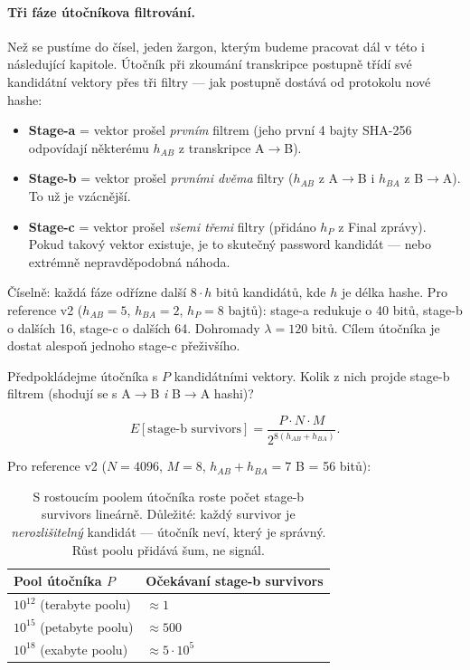 \documentclass[11pt,a4paper]{article}
\begin{document}
\paragraph{Tři fáze útočníkova filtrování.} Než se pustíme do čísel, jeden žargon, kterým budeme pracovat dál v této i následující kapitole. Útočník při zkoumání transkripce postupně třídí své kandidátní vektory přes tři filtry --- jak postupně dostává od protokolu nové hashe:
\begin{itemize}[leftmargin=*]
\item \textbf{Stage-a} = vektor prošel \emph{prvním} filtrem (jeho první 4 bajty SHA-256 odpovídají některému $h_{AB}$ z transkripce A$\to$B).
\item \textbf{Stage-b} = vektor prošel \emph{prvními dvěma} filtry ($h_{AB}$ z A$\to$B i $h_{BA}$ z B$\to$A). To už je vzácnější.
\item \textbf{Stage-c} = vektor prošel \emph{všemi třemi} filtry (přidáno $h_P$ z Final zprávy). Pokud takový vektor existuje, je to skutečný password kandidát --- nebo extrémně nepravděpodobná náhoda.
\end{itemize}
Číselně: každá fáze odřízne další $8 \cdot h$ bitů kandidátů, kde $h$ je délka hashe. Pro reference v2 ($h_{AB}=5$, $h_{BA}=2$, $h_P=8$ bajtů): stage-a redukuje o 40 bitů, stage-b o dalších 16, stage-c o dalších 64. Dohromady $\lambda = 120$ bitů. Cílem útočníka je dostat alespoň jednoho stage-c přeživšího.

\medskip
Předpokládejme útočníka s $P$ kandidátními vektory. Kolik z nich projde stage-b filtrem (shodují se s A$\to$B \emph{i} B$\to$A hashi)?

\[
E[\text{stage-b survivors}] = \frac{P \cdot N \cdot M}{2^{8(h_{AB} + h_{BA})}}.
\]

Pro reference v2 ($N = 4096$, $M = 8$, $h_{AB} + h_{BA} = 7$ B = 56 bitů):

\begin{table}[ht]
\centering
\small
\begin{tabular}{ll}
\toprule
Pool útočníka $P$ & Očekávaní stage-b survivors \\
\midrule
$10^{12}$ (terabyte poolu) & $\approx 1$ \\
$10^{15}$ (petabyte poolu) & $\approx 500$ \\
$10^{18}$ (exabyte poolu) & $\approx 5 \cdot 10^{5}$ \\
\bottomrule
\end{tabular}
\caption{S rostoucím poolem útočníka roste počet stage-b survivors lineárně. Důležité: každý survivor je \emph{nerozlišitelný} kandidát --- útočník neví, který je správný. Růst poolu přidává šum, ne signál.}
\label{tab:pop-flooding}
\end{table}
\end{document}
